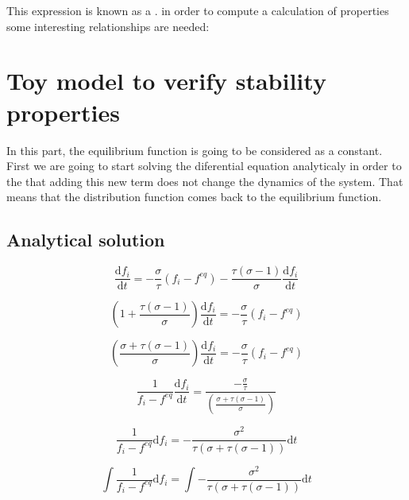 \documentclass{article}
\begin{document}
This expression is known as a . in order to compute a calculation of properties some interesting relationships are needed:

\section{Toy model to verify stability properties}

In this part, the equilibrium function is going to be considered as a constant.
First we are going to start solving the diferential equation analyticaly in order to the that adding this new term does not change the dynamics of the system.
That means that the distribution function comes back to the equilibrium function.

\subsection{Analytical solution}

\begin{equation}
    \frac{\mathrm{d} f_{i}}{\mathrm{d} t}= -\frac{\sigma}{\tau}(f_i-f^{eq}) - \frac{\tau(\sigma-1)}{\sigma}\frac{\mathrm{d}f_{i}}{\mathrm{d}t}
\end{equation}

\begin{equation*}
    \left(1 + \frac{\tau(\sigma-1)}{\sigma}\right)\frac{\mathrm{d} f_{i}}{\mathrm{d} t}= -\frac{\sigma}{\tau}(f_i-f^{eq}) 
\end{equation*}

\begin{equation*}
    \left(\frac{\sigma + \tau(\sigma-1)}{\sigma}\right)\frac{\mathrm{d} f_{i}}{\mathrm{d} t}= -\frac{\sigma}{\tau}(f_i-f^{eq}) 
\end{equation*}

\begin{equation*}
    \frac{1}{f_i-f^{eq}}\frac{\mathrm{d} f_{i}}{\mathrm{d} t}= \frac{-\frac{\sigma}{\tau}}{\left(\frac{\sigma + \tau(\sigma-1)}{\sigma}\right)} 
\end{equation*}

\begin{equation*}
    \frac{1}{f_i-f^{eq}}\mathrm{d} f_{i}= -\frac{\sigma^2}{\tau(\sigma + \tau(\sigma-1))}\mathrm{d} t 
\end{equation*}

\begin{equation*}
    \int\frac{1}{f_i-f^{eq}}\mathrm{d} f_{i}= \int-\frac{\sigma^2}{\tau(\sigma + \tau(\sigma-1))}\mathrm{d} t 
\end{equation*}
\end{document}
